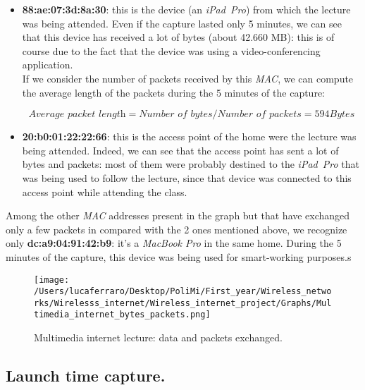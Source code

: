 \begin{itemize}
    \item \textbf{88:ae:07:3d:8a:30}: this is the device (an \textit{iPad\ Pro}) from which the lecture 
            was being attended. Even if the capture lasted only 5 minutes, we can see that this 
            device has received a lot of bytes (about 42.660 MB): this is of course due to the fact
            that the device was using a video-conferencing application.\\ 
            If we consider the number of packets received by this \textit{MAC}, we can compute the 
            average length of the packets during the 5 minutes of the capture:

            \begin{equation}
                \textit{Average packet length} = \textit{Number of bytes} / \textit{Number of packets} = 594 Bytes
            \end{equation}

    \item \textbf{20:b0:01:22:22:66}: this is the access point of the home were the lecture was being
            attended. Indeed, we can see that the access point has sent a lot of bytes and packets: 
            most of them were probably destined to the \textit{iPad\ Pro} that was being used to
            follow the lecture, since that device was connected to this access point while attending 
            the class. 
\end{itemize}

Among the other \textit{MAC} addresses present in the graph but that have exchanged only a few 
packets in compared with the 2 ones mentioned above, we recognize only \textbf{dc:a9:04:91:42:b9}: 
it's a \textit{MacBook Pro} in the same home. During the 5 minutes of the capture, this device was 
being used for smart-working purposes.s

\begin{figure}[h!]
    \centering
    \texttt{[image: /Users/lucaferraro/Desktop/PoliMi/First\_year/Wireless\_networks/Wirelesss\_internet/Wireless\_internet\_project/Graphs/Multimedia\_internet\_bytes\_packets.png]}
    \caption{Multimedia internet lecture: data and packets exchanged.}
    \label{fig:Multimedia internet lecture: data and packets exchanged.}
\end{figure}




\subsection{Launch time capture.}
